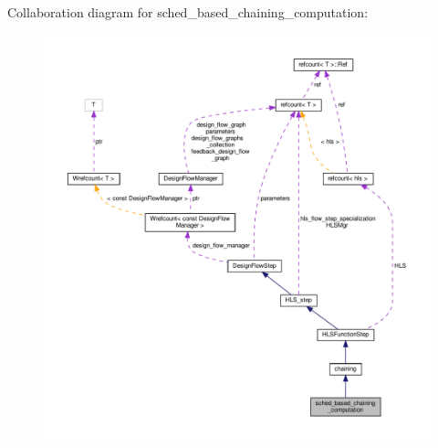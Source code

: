 Collaboration diagram for sched\+\_\+based\+\_\+chaining\+\_\+computation\+:
\nopagebreak
\begin{figure}[H]
\begin{center}
\leavevmode
\includegraphics[width=350pt]{dd/dd8/classsched__based__chaining__computation__coll__graph}
\end{center}
\end{figure}
